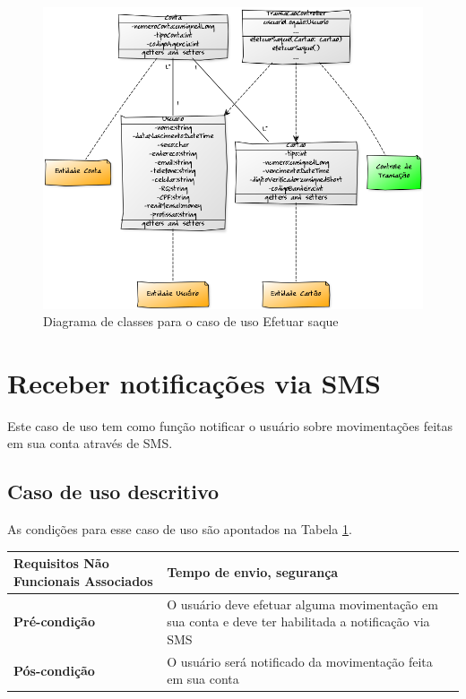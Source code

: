 \begin{figure}[!htb]
     \centering
     \includegraphics[scale=0.5]{diagramas/diagrama-de-classe/imagens/efetuarSaque.png}
     \caption{Diagrama de classes para o caso de uso Efetuar saque}
     \label{ddc:efetuarSaque}
\end{figure}

\section{Receber notificações via SMS}
\label{sec:ReceberSMS}

Este caso de uso tem como função notificar o usuário sobre movimentações feitas em sua conta através de SMS.

\subsection{Caso de uso descritivo}

As condições para esse caso de uso são apontados na Tabela \ref{tab:notificacaoSMS}.

\begin{table}[h]
  \centering
  \begin{tabular}{|p{4cm} | p{10cm} |}
      \hline
      \small{\textbf{Requisitos Não Funcionais Associados}}	& Tempo de envio, segurança	\\ \hline
      \small{\textbf{Pré-condição}}	&	O usuário deve efetuar alguma movimentação em sua conta e deve ter habilitada a notificação via SMS	\\ \hline
      \small{\textbf{Pós-condição}}	&	O usuário será notificado da movimentação feita em sua conta	\\ \hline
    \end{tabular}
 \label{tab:notificacaoSMS}
\end{table}

